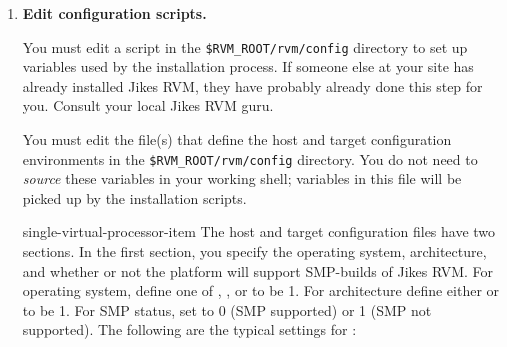 \begin{enumerate}
{\em Note:} You should define each of these environment variables as an
{\em absolute} path.  The builder template expansion process will crash
and burn if you use a \texttt{..} in these paths.

For a Linux\Rweb{}-Intel\Rweb{} environment, the exports
would be replaced with the following:

\begin{verbatim}
setenv RVM_HOST_CONFIG $RVM_ROOT/rvm/config/i686-pc-linux-gnu
setenv RVM_TARGET_CONFIG $RVM_ROOT/rvm/config/i686-pc-linux-gnu
\end{verbatim}

These two variables point to the same file when the type of system  
doing the build is the same as where you are going 
the execute Jikes\TMweb{} RVM.\@  To cross build a system
({\it e.g.}, to build on Linux/x86 for an AIX\TMweb{}/PowerPC\TMweb{}
platform), see [
  (sub-section~\Ref, page~\Pageref)]{cross-platform-building}.

\item {\bf Edit configuration scripts.}

You must edit a script in the \texttt{\$RVM\_\-ROOT/rvm/config}
directory to set  
up variables used by the installation process.  
If someone else at your site has already installed Jikes RVM, they have
probably already done this step for you.  Consult your local Jikes RVM guru.

You must edit the file(s) that define the host and target configuration
environments in the \texttt{\$RVM\_\-ROOT/rvm/config} directory.  
You do not need to {\em source} these variables in your working shell; 
variables in this file will be picked up by the installation scripts.  

\begin{Label}{single-virtual-processor-item}
The host and target configuration files have two sections.  In the
first section, you specify the operating system, architecture, and
whether or not the platform will support SMP-builds of Jikes RVM.\@ 
For operating system, define one of , 
,
or  
to be 1.  For architecture define either
 or  to be 1.  For SMP status, set
 to 0 (SMP supported) or 1 (SMP not
supported).  The following are the typical settings for
:


\end{Label}
\end{enumerate}
